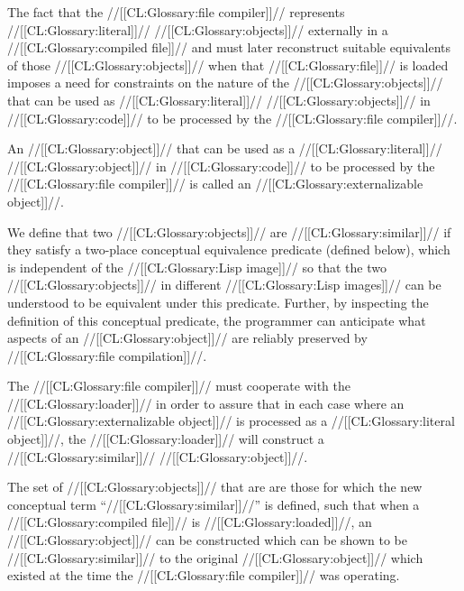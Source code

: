 The fact that the //[[CL:Glossary:file compiler]]// represents //[[CL:Glossary:literal]]// //[[CL:Glossary:objects]]// 
externally in a //[[CL:Glossary:compiled file]]// and must later reconstruct suitable 
equivalents of those //[[CL:Glossary:objects]]// when that //[[CL:Glossary:file]]// is loaded
imposes a need for constraints on the nature of the //[[CL:Glossary:objects]]// that can be 
used as //[[CL:Glossary:literal]]// //[[CL:Glossary:objects]]// in //[[CL:Glossary:code]]// to be processed 
by the //[[CL:Glossary:file compiler]]//.

An //[[CL:Glossary:object]]// that can be used as a //[[CL:Glossary:literal]]// //[[CL:Glossary:object]]// 
in //[[CL:Glossary:code]]// to be processed by the //[[CL:Glossary:file compiler]]// is called an
//[[CL:Glossary:externalizable object]]//.

We define that two //[[CL:Glossary:objects]]// are //[[CL:Glossary:similar]]// if they satisfy
a two-place conceptual equivalence predicate (defined below), which is
independent of the //[[CL:Glossary:Lisp image]]// so that the two //[[CL:Glossary:objects]]// in
different //[[CL:Glossary:Lisp images]]// can be understood to be equivalent under
this predicate.  Further, by inspecting the definition of this conceptual
predicate, the programmer can anticipate what aspects of an //[[CL:Glossary:object]]//
are reliably preserved by //[[CL:Glossary:file compilation]]//.

The //[[CL:Glossary:file compiler]]// must cooperate with the //[[CL:Glossary:loader]]// in order to
assure that in each case where an //[[CL:Glossary:externalizable object]]// is processed
as a //[[CL:Glossary:literal object]]//, the //[[CL:Glossary:loader]]// will construct a //[[CL:Glossary:similar]]//
//[[CL:Glossary:object]]//.

The set of //[[CL:Glossary:objects]]// that are  are those
for which the new conceptual term ``//[[CL:Glossary:similar]]//'' is defined, such that
when a //[[CL:Glossary:compiled file]]// is //[[CL:Glossary:loaded]]//, an //[[CL:Glossary:object]]// can be constructed
which can be shown to be //[[CL:Glossary:similar]]// to the original //[[CL:Glossary:object]]// which
existed at the time the //[[CL:Glossary:file compiler]]// was operating.


\endsubsubsection%


